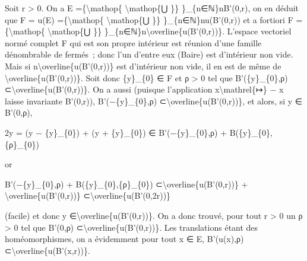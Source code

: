 \documentclass[]{article}
\begin{document}
Soit r \textgreater{} 0. On a E =\{\textbackslash{}mathop\{
\textbackslash{}mathop\{⋃ \}\} \}\_\{n∈ℕ\}nB'(0,r), on en déduit que F =
u(E) =\{\textbackslash{}mathop\{ \textbackslash{}mathop\{⋃ \}\}
\}\_\{n∈ℕ\}nu(B'(0,r)) et a fortiori F =\{\textbackslash{}mathop\{
\textbackslash{}mathop\{⋃ \}\}
\}\_\{n∈ℕ\}n\textbackslash{}overline\{u(B'(0,r))\}. L'espace vectoriel
normé complet F qui est son propre intérieur est réunion d'une famille
dénombrable de fermés~; donc l'un d'entre eux (Baire) est d'intérieur
non vide. Mais si n\textbackslash{}overline\{u(B'(0,r))\} est
d'intérieur non vide, il en est de même de
\textbackslash{}overline\{u(B'(0,r))\}. Soit donc \{y\}\_\{0\} ∈ F et ρ
\textgreater{} 0 tel que B'(\{y\}\_\{0\},ρ)
⊂\textbackslash{}overline\{u(B'(0,r))\}. On a aussi (puisque
l'application x\textbackslash{}mathrel\{↦\} − x laisse invariante
B'(0,r)), B'(−\{y\}\_\{0\},ρ) ⊂\textbackslash{}overline\{u(B'(0,r))\},
et alors, si y ∈ B'(0,ρ),

2y = (y − \{y\}\_\{0\}) + (y + \{y\}\_\{0\}) ∈ B'(−\{y\}\_\{0\},ρ) +
B(\{y\}\_\{0\},\{ρ\}\_\{0\})

or

B'(−\{y\}\_\{0\},ρ) + B(\{y\}\_\{0\},\{ρ\}\_\{0\})
⊂\textbackslash{}overline\{u(B'(0,r))\} +
\textbackslash{}overline\{u(B'(0,r))\}
⊂\textbackslash{}overline\{u(B'(0,2r))\}

(facile) et donc y ∈\textbackslash{}overline\{u(B'(0,r))\}. On a donc
trouvé, pour tout r \textgreater{} 0 un ρ \textgreater{} 0 tel que
B'(0,ρ) ⊂\textbackslash{}overline\{u(B'(0,r))\}. Les translations étant
des homéomorphismes, on a évidemment pour tout x ∈ E, B'(u(x),ρ)
⊂\textbackslash{}overline\{u(B'(x,r))\}.
\end{document}
